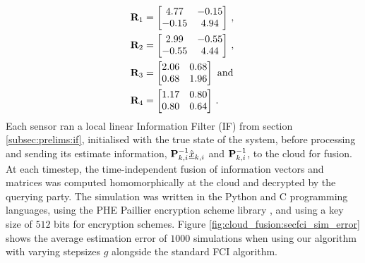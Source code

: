 \begin{equation}\label{eq:cloud_fusion:secfci_measurement_model_covariances}
    \begin{split}
        &{{\mathbf{R}}}_1 = 
        \begin{bmatrix}
            4.77 & -0.15\\
            -0.15 & 4.94
        \end{bmatrix}\,,\\
        &{{\mathbf{R}}}_2 = 
        \begin{bmatrix}
            2.99 & -0.55\\
            -0.55 & 4.44
        \end{bmatrix}\,,\\
        &{{\mathbf{R}}}_3 = 
        \begin{bmatrix}
            2.06 & 0.68\\
            0.68 & 1.96
        \end{bmatrix}\text{ and }\\
        &{{\mathbf{R}}}_4 = 
        \begin{bmatrix}
            1.17 & 0.80\\
            0.80 & 0.64
        \end{bmatrix}\,.
    \end{split}
\end{equation}
Each sensor ran a local linear Information Filter (IF) from section \ref{subsec:prelims:if}, initialised with the true state of the system, before processing and sending its estimate information, ${{\mathbf{P}}}_{k, i}^{-1}\hat{{\underline{x}}}_{k, i}$ and ${{\mathbf{P}}}_{k, i}^{-1}$, to the cloud for fusion. At each timestep, the time-independent fusion of information vectors and matrices was computed homomorphically at the cloud and decrypted by the querying party. The simulation was written in the Python and C programming languages, using the PHE Paillier encryption scheme library \cite{csirosdata61PythonPaillierLibrary2013}, and using a key size of $512$ bits for encryption schemes. Figure \ref{fig:cloud_fusion:secfci_sim_error} shows the average estimation error of $1000$ simulations when using our algorithm with varying stepsizes $g$ alongside the standard FCI algorithm. 
